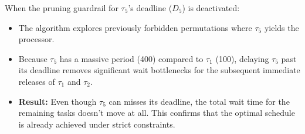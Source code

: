 \documentclass{report}
\begin{document}
When the pruning guardrail for $\tau_5$'s deadline ($D_5$) is deactivated:

\begin{itemize}
    \item The algorithm explores previously forbidden permutations where $\tau_5$ yields the processor.
    \item Because $\tau_5$ has a massive period (400) compared to $\tau_1$ (100), delaying $\tau_5$ past its deadline removes significant wait bottlenecks for the subsequent immediate releases of $\tau_1$ and $\tau_2$.
    \item \textbf{Result:} Even though $\tau_5$ can misses its deadline, the total wait time for the remaining tasks doesn't move at all. This confirms that the optimal schedule is already achieved under strict constraints.
\end{itemize}
\end{document}
